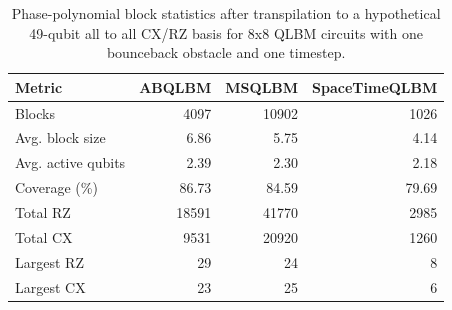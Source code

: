 \begin{table}[ht]
\centering
\begin{tabular}{lrrr}
\hline
Metric & ABQLBM & MSQLBM & SpaceTimeQLBM \\
\hline
Blocks & 4097 & 10902 & 1026 \\
Avg. block size & 6.86 & 5.75 & 4.14 \\
Avg. active qubits & 2.39 & 2.30 & 2.18 \\
Coverage (\%) & 86.73 & 84.59 & 79.69 \\
Total RZ & 18591 & 41770 & 2985 \\
Total CX & 9531 & 20920 & 1260 \\
Largest RZ & 29 & 24 & 8 \\
Largest CX & 23 & 25 & 6 \\
\hline
\end{tabular}
\caption{Phase-polynomial block statistics after transpilation to a hypothetical 49-qubit all to all CX/RZ basis for 8x8 QLBM circuits with one bounceback obstacle and one timestep.}
\label{tab:phase-poly-block-statistics-all-to-all}
\end{table}
